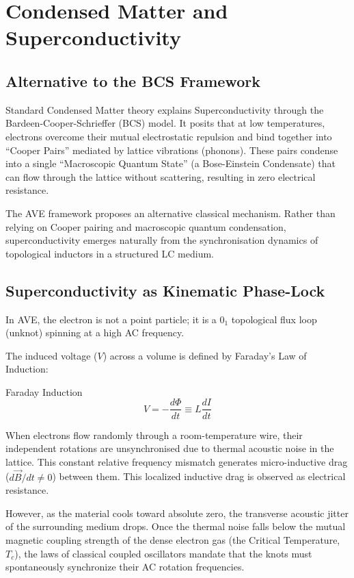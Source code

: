 \chapter{Condensed Matter and Superconductivity}
\label{ch:condensed_matter}

\section{Alternative to the BCS Framework}
Standard Condensed Matter theory explains Superconductivity through the Bardeen-Cooper-Schrieffer (BCS) model. It posits that at low temperatures, electrons overcome their mutual electrostatic repulsion and bind together into ``Cooper Pairs'' mediated by lattice vibrations (phonons). These pairs condense into a single ``Macroscopic Quantum State'' (a Bose-Einstein Condensate) that can flow through the lattice without scattering, resulting in zero electrical resistance.

The AVE framework proposes an alternative classical mechanism. Rather than relying on Cooper pairing and macroscopic quantum condensation, superconductivity emerges naturally from the synchronisation dynamics of topological inductors in a structured LC medium.

\section{Superconductivity as Kinematic Phase-Lock}
In AVE, the electron is not a point particle; it is a $0_1$ topological flux loop (unknot) spinning at a high AC frequency. 

The induced voltage ($V$) across a volume is defined by Faraday's Law of Induction:
\begin{resultbox}{Faraday Induction}
\begin{equation}
    V = - \frac{d\Phi}{dt} \equiv L \frac{dI}{dt}
\end{equation}
\end{resultbox}

When electrons flow randomly through a room-temperature wire, their independent rotations are unsynchronised due to thermal acoustic noise in the lattice. This constant relative frequency mismatch generates micro-inductive drag ($d\vec{B}/dt \neq 0$) between them. This localized inductive drag is observed as electrical resistance.

However, as the material cools toward absolute zero, the transverse acoustic jitter of the surrounding medium drops. Once the thermal noise falls below the mutual magnetic coupling strength of the dense electron gas (the Critical Temperature, $T_c$), the laws of classical coupled oscillators mandate that the knots must spontaneously synchronize their AC rotation frequencies.

